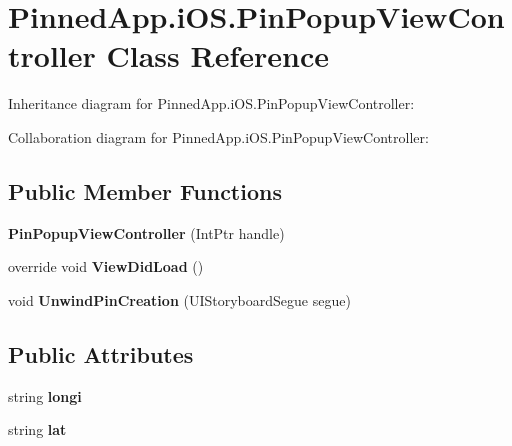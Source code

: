 \hypertarget{class_pinned_app_1_1i_o_s_1_1_pin_popup_view_controller}{}\section{Pinned\+App.\+i\+O\+S.\+Pin\+Popup\+View\+Controller Class Reference}
\label{class_pinned_app_1_1i_o_s_1_1_pin_popup_view_controller}


Inheritance diagram for Pinned\+App.\+i\+O\+S.\+Pin\+Popup\+View\+Controller\+:


Collaboration diagram for Pinned\+App.\+i\+O\+S.\+Pin\+Popup\+View\+Controller\+:
\subsection*{Public Member Functions}
\begin{DoxyCompactItemize}
\item 
\mbox{\label{class_pinned_app_1_1i_o_s_1_1_pin_popup_view_controller_adfe889f7fb4e5f6976282df4107e950f}} 
{\bfseries Pin\+Popup\+View\+Controller} (Int\+Ptr handle)
\item 
\mbox{\label{class_pinned_app_1_1i_o_s_1_1_pin_popup_view_controller_a2e9db1c16781aa356151ab28a43671eb}} 
override void {\bfseries View\+Did\+Load} ()
\item 
\mbox{\label{class_pinned_app_1_1i_o_s_1_1_pin_popup_view_controller_a3cc8a6a8de6ae980b8aca31142c2614d}} 
void {\bfseries Unwind\+Pin\+Creation} (U\+I\+Storyboard\+Segue segue)
\end{DoxyCompactItemize}
\subsection*{Public Attributes}
\begin{DoxyCompactItemize}
\item 
\mbox{\label{class_pinned_app_1_1i_o_s_1_1_pin_popup_view_controller_a63ad1ef9d5c718f7c4439d8fa4e3eb4c}} 
string {\bfseries longi}
\item 
\mbox{\label{class_pinned_app_1_1i_o_s_1_1_pin_popup_view_controller_a22640787616954b0325aab3329572d15}} 
string {\bfseries lat}
\end{DoxyCompactItemize}



